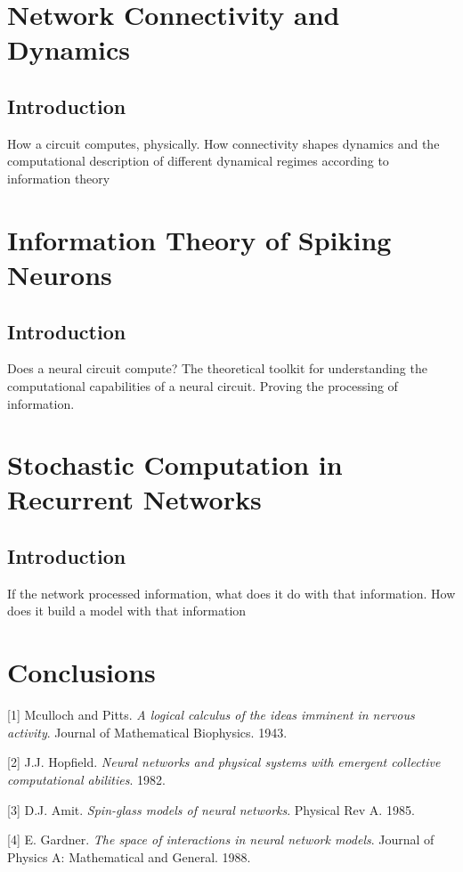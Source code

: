 \documentclass{ucetd}
\begin{document}
\chapter{Network Connectivity and Dynamics}
\section{Introduction}
How a circuit computes, physically. How connectivity shapes dynamics and the computational description of different dynamical regimes according to information theory

\chapter{Information Theory of Spiking Neurons}
\section{Introduction}
Does a neural circuit compute? The theoretical toolkit for understanding the computational capabilities of a neural circuit. Proving the processing of information.

\chapter{Stochastic Computation in Recurrent Networks}
\section{Introduction}
If the network processed information, what does it do with that information. How does it build a model with that information

\chapter{Conclusions}


\makebibliography

[1] Mculloch and Pitts. \textit{A logical calculus of the ideas imminent in nervous activity}. Journal of Mathematical Biophysics. 1943.

[2] J.J. Hopfield. \textit{Neural networks and physical systems with emergent collective computational abilities}. 1982.

[3] D.J. Amit. \textit{Spin-glass models of neural networks}. Physical Rev A. 1985.

[4] E. Gardner. \textit{The space of interactions in neural network models}. Journal of Physics A: Mathematical and General. 1988.
\end{document}
